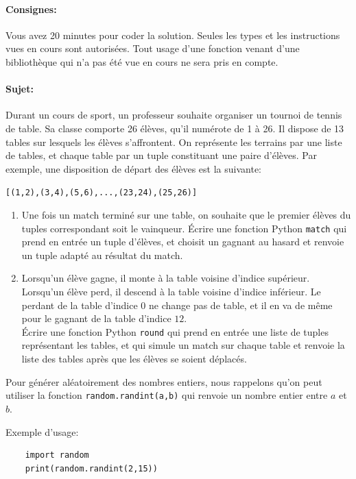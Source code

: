 \documentclass[a4paper,11pt]{article}
\begin{document}
\vspace{-0.3 cm}

\paragraph*{Consignes:} Vous avez 20 minutes pour coder la solution. Seules les types et les instructions vues en cours sont autorisées. Tout usage d'une fonction 
venant d'une bibliothèque qui n'a pas été vue en cours ne sera pris en compte. 

\paragraph*{Sujet:} 
Durant un cours de sport, un professeur souhaite organiser un tournoi de tennis de table. Sa classe comporte 26 élèves, qu'il numérote de 1 à 26. Il dispose de 13 tables sur lesquels les élèves s'affrontent. On représente les terrains par une liste de tables, et chaque table par un tuple constituant une paire d'élèves. Par exemple, une disposition de départ des élèves est la suivante: 
\begin{center}
\texttt{[(1,2),(3,4),(5,6),...,(23,24),(25,26)]}
\end{center}


\begin{enumerate}
  \item[1.] Une fois un match terminé sur une table, on souhaite que le premier élèves du tuples correspondant soit le vainqueur. Écrire une fonction Python \texttt{match} qui prend en entrée un tuple d'élèves, et choisit un gagnant au hasard et renvoie un tuple adapté au résultat du match.
  \item[2.] Lorsqu'un élève gagne, il monte à la table voisine d'indice supérieur. Lorsqu'un élève perd, il descend à la table voisine d'indice inférieur. Le perdant de la table d'indice $0$ ne change pas de table, et il en va de même pour le gagnant de la table d'indice $12$.\\   
  Écrire une fonction Python \texttt{round} qui prend en entrée une liste de tuples représentant les tables, et qui simule un match sur chaque table et renvoie la liste des tables après que les élèves se soient déplacés.
\end{enumerate}
 
Pour générer aléatoirement des nombres entiers, nous rappelons qu'on peut utiliser la fonction \texttt{random.randint(a,b)} qui renvoie un nombre entier entre $a$ et $b$. 

\vspace{0.2 cm}
Exemple d'usage:
\begin{verbatim}
	import random	
	print(random.randint(2,15))
\end{verbatim}
\end{document}
